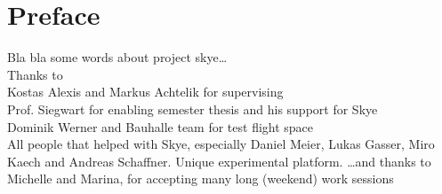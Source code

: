 \chapter*{Preface}

Bla bla some words about project skye\dots
\\
Thanks to \\
Kostas Alexis and Markus Achtelik for supervising \\
Prof. Siegwart for enabling semester thesis and his support for Skye \\
Dominik Werner and Bauhalle team for test flight space \\
All people that helped with Skye, especially Daniel Meier, Lukas Gasser, Miro Kaech and Andreas Schaffner. Unique experimental platform.
\dots and thanks to Michelle and Marina, for accepting many long (weekend) work sessions